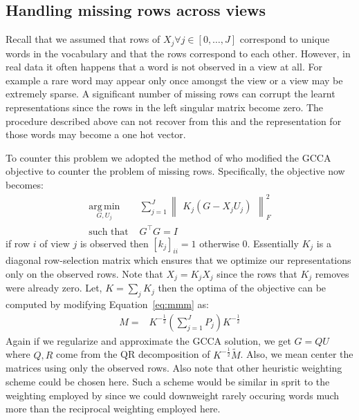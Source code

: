 \documentclass[11pt]{article}
\begin{document}
\subsection{Handling missing rows across views}
\label{ssec:missing}
Recall that we assumed that rows of $X_j \forall j \in [0,\ldots , J]$ correspond to unique
words in the vocabulary and that the rows correspond to each
other. However, in real data it often happens that a word is not observed in a view at
all. For example a rare word may appear only once amongst the view or
a view may be extremely sparse. A significant number of 
missing rows can corrupt the learnt representations since the rows
in the left singular matrix become zero. The procedure described above
can not recover from this and the representation for those words may become a
one hot vector. 

To counter this problem we adopted the method of
\cite{van2006generalized} who modified the GCCA objective to counter the problem of missing
rows. Specifically, the objective now becomes:
\begin{equation}
  \label{eq:gcca2}
\begin{split}
  \operatorname*{arg\,min}_{G,U_j} & \sum_{j=1}^J \begin{Vmatrix} K_j(G - X_jU_j) \end{Vmatrix}^2_F \\
  \text{such that } & G^\top G = I
\end{split}
\end{equation}
if row $i$ of view $j$ is observed then $[k_j]_{ii} = 1$ otherwise $0$.
Essentially $K_j$ is a diagonal row-selection matrix which ensures
that we optimize our representations only on the observed rows. Note that
$X_j = K_jX_j$ since the rows that $K_j$ removes were already
zero. Let, $K =
\sum_j K_j$ then the optima
of the objective can be computed by modifying Equation~\ref{eq:mmm} as:
\begin{align}
  M =& K^{-\frac{1}{2}}(\sum_{j=1}^J P_j)K^{-\frac{1}{2}}
\end{align}
Again if we regularize and approximate the GCCA solution, we get
$G=QU$ where $Q, R$ come from the QR decomposition of
$K^{-\frac{1}{2}}\tilde{M}$. Also, we mean center the matrices using
only the observed rows. Also note that other heuristic weighting scheme could be chosen
here. Such a scheme would be similar in sprit to the weighting employed
by \cite{pennington2014glove} since we could downweight rarely
occuring words much more than the reciprocal weighting employed
here.
\end{document}
